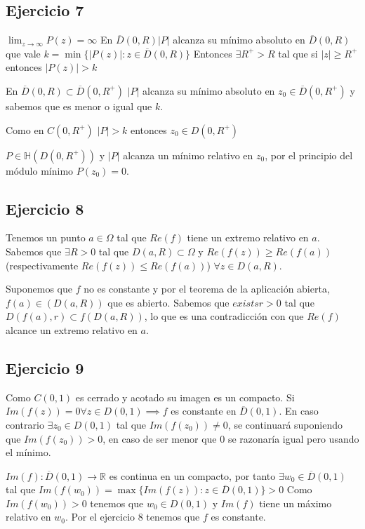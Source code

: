 \subsection{Ejercicio 7}
$\lim_{z\rightarrow\infty} P(z) = \infty$
En  $\overline{D}(0,R) |P|$ alcanza su mínimo absoluto en $\overline{D}(0,R)$ que vale $k=\min\{ |P(z)| : z\in\overline{D}(0,R) \}$ 
Entonces
$\exists R^+>R$ tal que si $|z|\geq R^+$ entonces $|P(z)| > k$

En $\overline{D}(0,R) \subset \overline{D}(0,R^+)$ $|P|$ alcanza su mínimo absoluto en $z_0\in\overline{D}(0,R^+)$ y sabemos que es menor o igual que $k$.

Como en $C(0,R^+)$ $|P|>k$ entonces $z_0\in D(0,R^+)$

$P\in\mathbb{H}(D(0,R^+))$ y $|P|$ alcanza un mínimo relativo en $z_0$, por el principio del módulo mínimo $P(z_0)=0$.


\subsection{Ejercicio 8}
Tenemos un punto $a\in\Omega$ tal que $Re(f)$ tiene un extremo relativo en $a$.
Sabemos que $\exists R>0$ tal que $D(a,R)\subset\Omega$ y 
$Re(f(z)) \geq Re(f(a))$ (respectivamente $Re(f(z))\leq Re(f(a))$) $\forall z\in D(a,R)$.

Suponemos que $f$ no es constante y por el teorema de la aplicación abierta, $f(a)\in(D(a,R))$ que es abierto.
Sabemos que $exists r>0$ tal que $D(f(a),r) \subset f(D(a,R))$, lo que es una contradicción con que $Re(f)$ alcance un extremo relativo en $a$.


\subsection{Ejercicio 9}
Como $C(0,1)$ es cerrado y acotado su imagen es un compacto.
Si $Im(f(z))=0 	\forall z\in D(0,1) \implies f$ es constante en $\overline{D}(0,1)$.
En caso contrario $\exists z_0 \in D(0,1)$ tal que $Im(f(z_0)) \not=0$, se continuará suponiendo que $Im(f(z_0))>0$, en caso de ser menor que $0$ se razonaría igual pero usando el mínimo.

$Im(f):\overline{D}(0,1)\rightarrow \mathbb{R}$ es continua en un compacto, por tanto $\exists w_0\in\overline{D}(0,1)$ tal que $Im(f(w_0)) = \max\{ Im(f(z)) : z\in\overline{D}(0,1) \} > 0$
Como $Im(f(w_0))>0$ tenemos que $w_0\in D(0,1)$ y $Im(f)$ tiene un máximo relativo en $w_0$.
Por el ejercicio $8$ tenemos que $f$ es constante.


